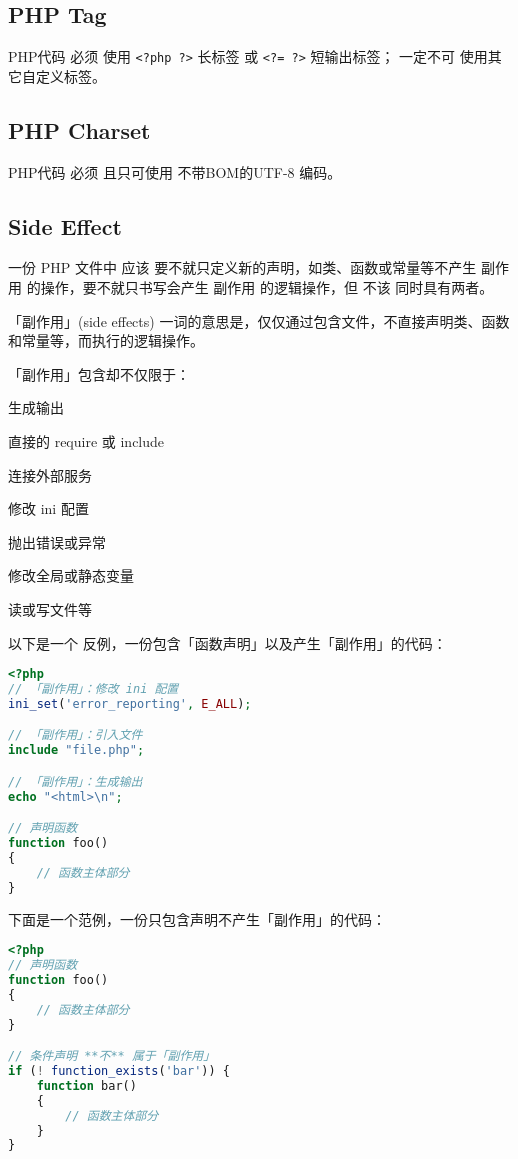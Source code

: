 \subsection{PHP Tag}


PHP代码 必须 使用 \texttt{<?php ?>} 长标签 或 \texttt{<?= ?>} 短输出标签； 一定不可 使用其它自定义标签。

\subsection{PHP Charset}

PHP代码 必须 且只可使用 不带BOM的UTF-8 编码。


\subsection{Side Effect}

一份 PHP 文件中 应该 要不就只定义新的声明，如类、函数或常量等不产生 副作用 的操作，要不就只书写会产生 副作用 的逻辑操作，但 不该 同时具有两者。

「副作用」(side effects) 一词的意思是，仅仅通过包含文件，不直接声明类、函数和常量等，而执行的逻辑操作。

「副作用」包含却不仅限于：

\begin{compactitem}
\item 生成输出
\item 直接的 require 或 include
\item 连接外部服务
\item 修改 ini 配置
\item 抛出错误或异常
\item 修改全局或静态变量
\item 读或写文件等
\end{compactitem}

以下是一个 反例，一份包含「函数声明」以及产生「副作用」的代码：

\begin{lstlisting}[language=PHP]
<?php
// 「副作用」：修改 ini 配置
ini_set('error_reporting', E_ALL);

// 「副作用」：引入文件
include "file.php";

// 「副作用」：生成输出
echo "<html>\n";

// 声明函数
function foo()
{
    // 函数主体部分
}
\end{lstlisting}

下面是一个范例，一份只包含声明不产生「副作用」的代码：

\begin{lstlisting}[language=PHP]
<?php
// 声明函数
function foo()
{
    // 函数主体部分
}

// 条件声明 **不** 属于「副作用」
if (! function_exists('bar')) {
    function bar()
    {
        // 函数主体部分
    }
}
\end{lstlisting}


